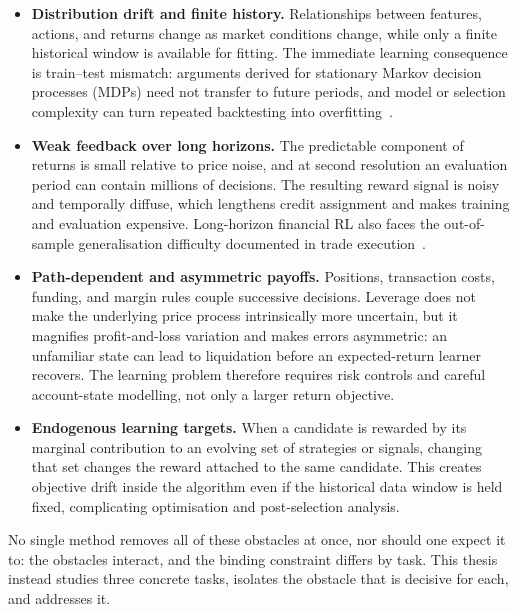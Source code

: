 \begin{itemize}
\item \textbf{Distribution drift and finite history.} Relationships between features, actions, and returns change as market conditions change, while only a finite historical window is available for fitting. The immediate learning consequence is train--test mismatch: arguments derived for stationary Markov decision processes (MDPs) need not transfer to future periods, and model or selection complexity can turn repeated backtesting into overfitting~\cite{harvey2016cross}.

\item \textbf{Weak feedback over long horizons.} The predictable component of returns is small relative to price noise, and at second resolution an evaluation period can contain millions of decisions. The resulting reward signal is noisy and temporally diffuse, which lengthens credit assignment and makes training and evaluation expensive. Long-horizon financial RL also faces the out-of-sample generalisation difficulty documented in trade execution~\cite{zhang2023towards}.

\item \textbf{Path-dependent and asymmetric payoffs.} Positions, transaction costs, funding, and margin rules couple successive decisions. Leverage does not make the underlying price process intrinsically more uncertain, but it magnifies profit-and-loss variation and makes errors asymmetric: an unfamiliar state can lead to liquidation before an expected-return learner recovers. The learning problem therefore requires risk controls and careful account-state modelling, not only a larger return objective.

\item \textbf{Endogenous learning targets.} When a candidate is rewarded by its marginal contribution to an evolving set of strategies or signals, changing that set changes the reward attached to the same candidate. This creates objective drift inside the algorithm even if the historical data window is held fixed, complicating optimisation and post-selection analysis.
\end{itemize}

No single method removes all of these obstacles at once, nor should one expect it to: the obstacles interact, and the binding constraint differs by task. This thesis instead studies three concrete tasks, isolates the obstacle that is decisive for each, and addresses it.

